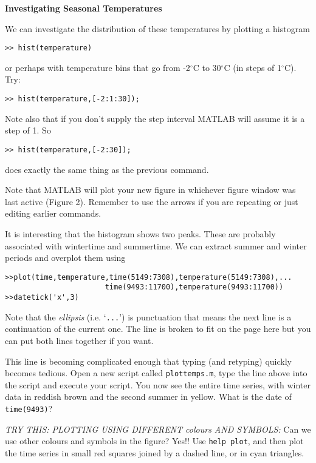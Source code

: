 \documentclass[letterpaper]{article}
\begin{document}
\vskip 10pt
{\bf Investigating Seasonal Temperatures}

We can investigate the distribution of these temperatures by plotting a histogram
\begin{verbatim}
>> hist(temperature)
\end{verbatim}
or perhaps with temperature bins that go from -2$^\circ$C to 30$^\circ$C (in steps of 1$^\circ$C).  Try:
\begin{verbatim}
>> hist(temperature,[-2:1:30]);
\end{verbatim}

Note also that if you don't supply the step interval MATLAB will assume it is a step of 1.   So
\begin{verbatim}
>> hist(temperature,[-2:30]);
\end{verbatim}

does exactly the same thing as the previous command.

Note that MATLAB will plot your new figure in whichever figure window was last active (Figure 2).  Remember
to use the arrows if you are repeating or just editing earlier commands.

It is interesting that the histogram shows two peaks. These are probably associated
with wintertime and summertime. We can extract summer and winter periods and overplot them
using
\begin{verbatim}
>>plot(time,temperature,time(5149:7308),temperature(5149:7308),...
                       time(9493:11700),temperature(9493:11700))
>>datetick('x',3)
\end{verbatim}

Note that the {\em ellipsis} (i.e. `\verb+...+') is punctuation
that means the next line is a continuation of the current one. The line is broken to fit
on the page here but you can put both lines together if you want.

This line is becoming complicated enough that typing (and retyping) quickly becomes
tedious.  Open a new script called \verb+plottemps.m+,
 type the line above into the script and execute your script.
You now see the entire time series, with winter data in reddish brown and the
second summer in yellow. What is the date of \verb+time(9493)+?

{\it TRY THIS:  PLOTTING USING DIFFERENT colours AND SYMBOLS:} Can we use other colours and symbols in the figure?  Yes!!  Use
\verb+help plot+, and then plot the time series in small red squares joined
by a dashed line, or in cyan triangles.
\end{document}

